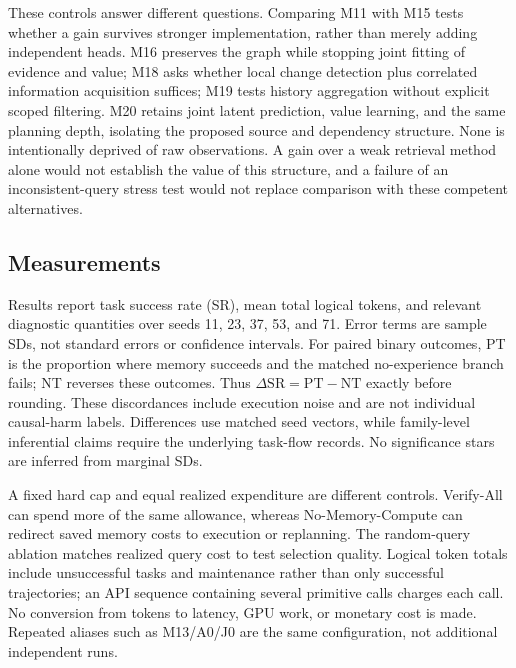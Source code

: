 \documentclass[sigconf,anonymous,review]{acmart}
\theoremstyle{zhplain}
\begin{document}
These controls answer different questions. Comparing M11 with M15 tests whether a gain survives stronger implementation, rather than merely adding independent heads. M16 preserves the graph while stopping joint fitting of evidence and value; M18 asks whether local change detection plus correlated information acquisition suffices; M19 tests history aggregation without explicit scoped filtering. M20 retains joint latent prediction, value learning, and the same planning depth, isolating the proposed source and dependency structure. None is intentionally deprived of raw observations. A gain over a weak retrieval method alone would not establish the value of this structure, and a failure of an inconsistent-query stress test would not replace comparison with these competent alternatives.

\subsection{Measurements}
Results report task success rate (SR), mean total logical tokens, and relevant diagnostic quantities over seeds 11, 23, 37, 53, and 71. Error terms are sample SDs, not standard errors or confidence intervals. For paired binary outcomes, PT is the proportion where memory succeeds and the matched no-experience branch fails; NT reverses these outcomes. Thus \(\Delta\mathrm{SR}=\mathrm{PT}-\mathrm{NT}\) exactly before rounding. These discordances include execution noise and are not individual causal-harm labels. Differences use matched seed vectors, while family-level inferential claims require the underlying task-flow records. No significance stars are inferred from marginal SDs.

A fixed hard cap and equal realized expenditure are different controls. Verify-All can spend more of the same allowance, whereas No-Memory-Compute can redirect saved memory costs to execution or replanning. The random-query ablation matches realized query cost to test selection quality. Logical token totals include unsuccessful tasks and maintenance rather than only successful trajectories; an API sequence containing several primitive calls charges each call. No conversion from tokens to latency, GPU work, or monetary cost is made. Repeated aliases such as M13/A0/J0 are the same configuration, not additional independent runs.
\end{document}
